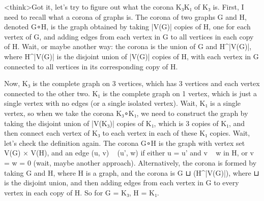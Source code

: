 <think>Got it, let's try to figure out what the corona K₃K₁ of K₃ is. First, I need to recall what a corona of graphs is. The corona of two graphs G and H, denoted G∘H, is the graph obtained by taking |V(G)| copies of H, one for each vertex of G, and adding edges from each vertex in G to all vertices in each copy of H. Wait, or maybe another way: the corona is the union of G and H^|V(G)|, where H^|V(G)| is the disjoint union of |V(G)| copies of H, with each vertex in G connected to all vertices in its corresponding copy of H. 

Now, K₃ is the complete graph on 3 vertices, which has 3 vertices and each vertex connected to the other two. K₁ is the complete graph on 1 vertex, which is just a single vertex with no edges (or a single isolated vertex). Wait, K₁ is a single vertex, so when we take the corona K₃∘K₁, we need to construct the graph by taking the disjoint union of |V(K₃)| copies of K₁, which is 3 copies of K₁, and then connect each vertex of K₃ to each vertex in each of these K₁ copies. Wait, let's check the definition again. The corona G∘H is the graph with vertex set V(G) × V(H), and an edge (u, v) ~ (u', w) if either u = u' and v ~ w in H, or v = w = 0 (wait, maybe another approach). Alternatively, the corona is formed by taking G and H, where H is a graph, and the corona is G ⊔ (H^|V(G)|), where ⊔ is the disjoint union, and then adding edges from each vertex in G to every vertex in each copy of H. So for G = K₃, H = K₁. 

